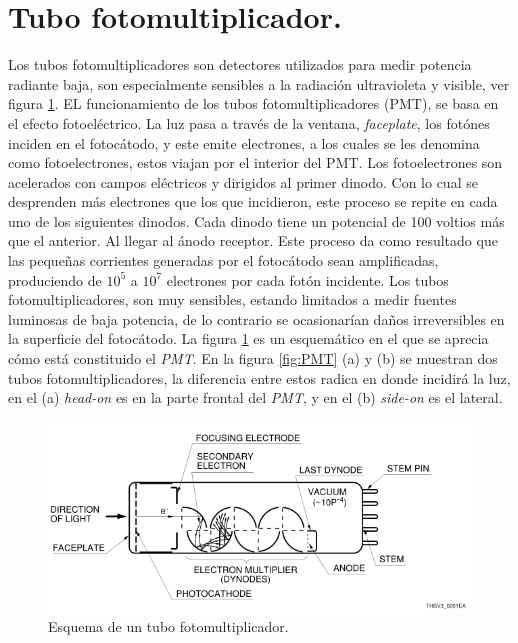 \section{Tubo fotomultiplicador.}
Los tubos fotomultiplicadores son detectores utilizados para medir potencia radiante baja, son especialmente sensibles a la radiación ultravioleta y visible, ver figura \ref{fig:pmte}. EL funcionamiento de los tubos fotomultiplicadores (PMT), se basa en el efecto fotoeléctrico.  
La luz pasa a través de la ventana, \textit{faceplate}, los fotónes inciden en el fotocátodo, y este emite electrones, a los cuales se les denomina como fotoelectrones, estos viajan por el interior del PMT.  Los fotoelectrones son acelerados con campos eléctricos y dirigidos al primer dinodo. Con lo cual se desprenden más electrones que los que incidieron, este proceso se repite en cada uno de los siguientes dinodos. Cada dinodo tiene un potencial de 100 voltios más que el anterior. Al llegar al ánodo receptor. Este proceso da como resultado que las pequeñas corrientes generadas por el fotocátodo sean amplificadas, produciendo de $10^5$ a $10^7$ electrones por cada fotón incidente.
Los tubos fotomultiplicadores, son muy sensibles, estando limitados a medir fuentes luminosas de baja potencia, de lo contrario se ocasionarían daños irreversibles en la superficie del fotocátodo.
La figura \ref{fig:pmte} es un esquemático en el que se aprecia cómo está constituido el \textit{PMT}. En la figura \ref{fig:PMT} (a) y (b) se muestran dos tubos fotomultiplicadores, la diferencia entre estos radica en donde incidirá la luz, en el (a) \textit{head-on} es en la parte frontal del \textit{PMT}, y en el (b) \textit{side-on} es el lateral. 
 
 \begin{figure}[h]
	\centering
	\includegraphics[width=0.9\linewidth]{Imagenes/2/PMT}
	\caption[Esquema de un tubo fotomultiplicador.]{Esquema de un tubo fotomultiplicador.\cite{Hamamatsu2006}}
	\label{fig:pmte}
\end{figure}

